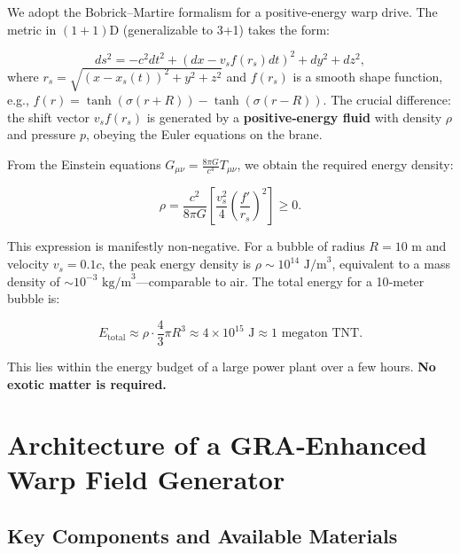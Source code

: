 \documentclass[11pt]{article}
\begin{document}
We adopt the Bobrick--Martire formalism for a positive‑energy warp drive. The metric in $(1+1)$D (generalizable to 3+1) takes the form:

\begin{equation}
ds^2 = -c^2 dt^2 + (dx - v_s f(r_s) dt)^2 + dy^2 + dz^2,
\label{eq:warp_metric}
\end{equation}
where $r_s = \sqrt{(x - x_s(t))^2 + y^2 + z^2}$ and $f(r_s)$ is a smooth shape function, e.g., $f(r) = \tanh(\sigma(r+R)) - \tanh(\sigma(r-R))$. The crucial difference: the shift vector $v_s f(r_s)$ is generated by a \textbf{positive‑energy fluid} with density $\rho$ and pressure $p$, obeying the Euler equations on the brane.

From the Einstein equations $G_{\mu\nu} = \frac{8\pi G}{c^4} T_{\mu\nu}$, we obtain the required energy density:

\begin{equation}
\rho = \frac{c^2}{8\pi G} \left[ \frac{v_s^2}{4} \left( \frac{f'}{r_s} \right)^2 \right] \ge 0.
\label{eq:positive_energy_density}
\end{equation}

This expression is manifestly non‑negative. For a bubble of radius $R = 10$ m and velocity $v_s = 0.1c$, the peak energy density is $\rho \sim 10^{14} \text{ J/m}^3$, equivalent to a mass density of $\sim 10^{-3} \text{ kg/m}^3$—comparable to air. The total energy for a 10‑meter bubble is:

\begin{equation}
E_{\text{total}} \approx \rho \cdot \frac{4}{3}\pi R^3 \approx 4 \times 10^{15} \text{ J} \approx 1 \text{ megaton TNT}.
\label{eq:total_energy}
\end{equation}

This lies within the energy budget of a large power plant over a few hours. \textbf{No exotic matter is required.}

\section{Architecture of a GRA‑Enhanced Warp Field Generator}

\subsection{Key Components and Available Materials}
\end{document}
